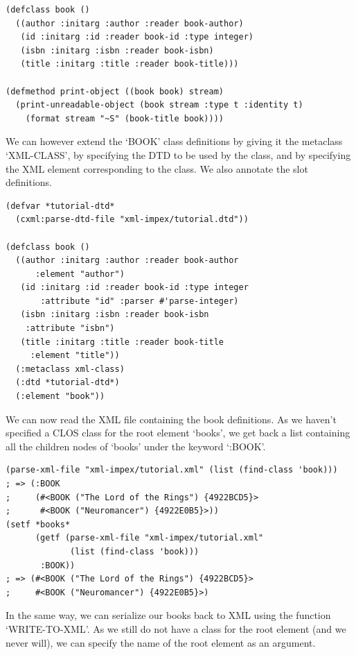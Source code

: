 \begin{Verbatim}[fontsize=\small,frame=leftline,framerule=0.9mm,rulecolor=\color{gray},framesep=5.1mm,xleftmargin=5mm,fontfamily=cmtt]
(defclass book ()
  ((author :initarg :author :reader book-author)
   (id :initarg :id :reader book-id :type integer)
   (isbn :initarg :isbn :reader book-isbn)
   (title :initarg :title :reader book-title)))

(defmethod print-object ((book book) stream)
  (print-unreadable-object (book stream :type t :identity t)
    (format stream "~S" (book-title book))))
\end{Verbatim}
We can however extend the `BOOK' class definitions by giving it
the metaclass `XML-CLASS', by specifying the DTD to be used by the
class, and by specifying the XML element corresponding to the
class. We also annotate the slot definitions.

\begin{Verbatim}[fontsize=\small,frame=leftline,framerule=0.9mm,rulecolor=\color{gray},framesep=5.1mm,xleftmargin=5mm,fontfamily=cmtt]
(defvar *tutorial-dtd*
  (cxml:parse-dtd-file "xml-impex/tutorial.dtd"))

(defclass book ()
  ((author :initarg :author :reader book-author
      :element "author")
   (id :initarg :id :reader book-id :type integer
       :attribute "id" :parser #'parse-integer)
   (isbn :initarg :isbn :reader book-isbn
    :attribute "isbn")
   (title :initarg :title :reader book-title
     :element "title"))
  (:metaclass xml-class)
  (:dtd *tutorial-dtd*)
  (:element "book"))
\end{Verbatim}
We can now read the XML file containing the book definitions. As
we haven't specified a CLOS class for the root element `books', we
get back a list containing all the children nodes of `books' under
the keyword `:BOOK'.

\begin{Verbatim}[fontsize=\small,frame=leftline,framerule=0.9mm,rulecolor=\color{gray},framesep=5.1mm,xleftmargin=5mm,fontfamily=cmtt]
(parse-xml-file "xml-impex/tutorial.xml" (list (find-class 'book)))
; => (:BOOK
;     (#<BOOK ("The Lord of the Rings") {4922BCD5}>
;      #<BOOK ("Neuromancer") {4922E0B5}>))
(setf *books*
      (getf (parse-xml-file "xml-impex/tutorial.xml"
             (list (find-class 'book)))
       :BOOK))
; => (#<BOOK ("The Lord of the Rings") {4922BCD5}>
;     #<BOOK ("Neuromancer") {4922E0B5}>)
\end{Verbatim}
In the same way, we can serialize our books back to XML using the
function `WRITE-TO-XML'. As we still do not have a class for the
root element (and we never will), we can specify the name of the
root element as an argument.


